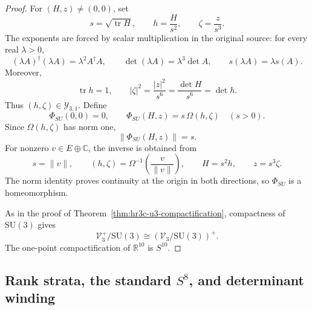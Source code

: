 \begin{proof}
For \((H,z)\ne(0,0)\), set
\begin{equation}
 s=\sqrt{\operatorname{tr}H},
 \qquad
 h=\frac{H}{s^2},
 \qquad
 \zeta=\frac{z}{s^3}.
 \label{eq:hr3c-weighted-normalization}
\end{equation}
The exponents are forced by scalar multiplication in the original source:
for every real \(\lambda>0\),
\begin{equation}
 (\lambda A)^\dagger(\lambda A)=\lambda^2A^\dagger A,
 \qquad
 \det(\lambda A)=\lambda^3\det A,
 \qquad
 s(\lambda A)=\lambda s(A).
 \label{eq:hr3c-scaling-degrees}
\end{equation}
Moreover,
\[
 \operatorname{tr}h=1,
 \qquad
 |\zeta|^2
 =\frac{|z|^2}{s^6}
 =\frac{\det H}{s^6}
 =\det h.
\]
Thus \((h,\zeta)\in\mathcal Y_{3,1}\).  Define
\begin{equation}
 \Phi_{SU}(0,0)=0,
 \qquad
 \Phi_{SU}(H,z)=s\,\Omega(h,\zeta)
 \quad(s>0).
 \label{eq:hr3c-su-radial-homeomorphism}
\end{equation}
Since \(\Omega(h,\zeta)\) has norm one,
\[
 \lVert\Phi_{SU}(H,z)\rVert=s.
\]
For nonzero \(v\in E\oplus\mathbb C\), the inverse is obtained from
\[
 s=\lVert v\rVert,
 \qquad
 (h,\zeta)=
 \Omega^{-1}\left(\frac{v}{\lVert v\rVert}\right),
 \qquad
 H=s^2h,
 \qquad
 z=s^3\zeta.
\]
The norm identity proves continuity at the origin in both directions, so
\(\Phi_{SU}\) is a homeomorphism.

As in the proof of Theorem~\ref{thm:hr3c-u3-compactification}, compactness
of \(\mathrm{SU}(3)\) gives
\[
 \mathscr V_3^+/\mathrm{SU}(3)
 \cong
 (\mathscr V_3/\mathrm{SU}(3))^+.
\]
The one-point compactification of \(\mathbb R^{10}\) is \(S^{10}\).
\end{proof}

\subsection{Rank strata, the standard \texorpdfstring{\(S^8\)}{S8}, and
determinant winding}
\label{subsec:hr3c-rank-complement}


